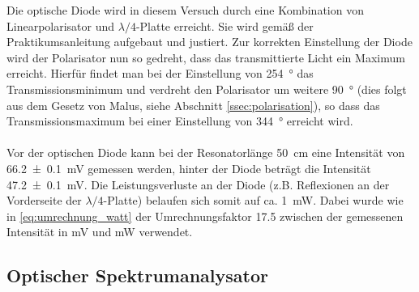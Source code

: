 \documentclass[11pt, a4paper]{article}
\numberwithin{equation}{section}
\begin{document}
Die optische Diode wird in diesem Versuch durch eine Kombination von Linearpolarisator und $\lambda/4$-Platte erreicht.
Sie wird gemäß der Praktikumsanleitung aufgebaut und justiert.
Zur korrekten Einstellung der Diode wird der Polarisator nun so gedreht, dass das transmittierte Licht ein Maximum erreicht.
Hierfür findet man bei der Einstellung von \SI{254}{\degree} das Transmissionsminimum und verdreht den Polarisator um weitere \SI{90}{\degree} (dies folgt aus dem Gesetz von Malus, siehe Abschnitt \ref{ssec:polarisation}), so dass das Transmissionsmaximum bei einer Einstellung von \SI{344}{\degree} erreicht wird.\\
\\
Vor der optischen Diode kann bei der Resonatorlänge \SI{50}{\centi\metre} eine Intensität von \SI{66.2+-0.1}{\milli\volt} gemessen werden, hinter der Diode beträgt die Intensität \SI{47.2+-0.1}{\milli\volt}.
Die Leistungsverluste an der Diode (z.B. Reflexionen an der Vorderseite der $\lambda/4$-Platte) belaufen sich somit auf ca. \SI{1}{\milli\watt}.
Dabei wurde wie in \eqref{eq:umrechnung_watt} der Umrechnungsfaktor \num{17.5} zwischen der gemessenen Intensität in \si{\milli\volt} und \si{\milli\watt} verwendet.

\subsection{Optischer Spektrumanalysator}
\end{document}
